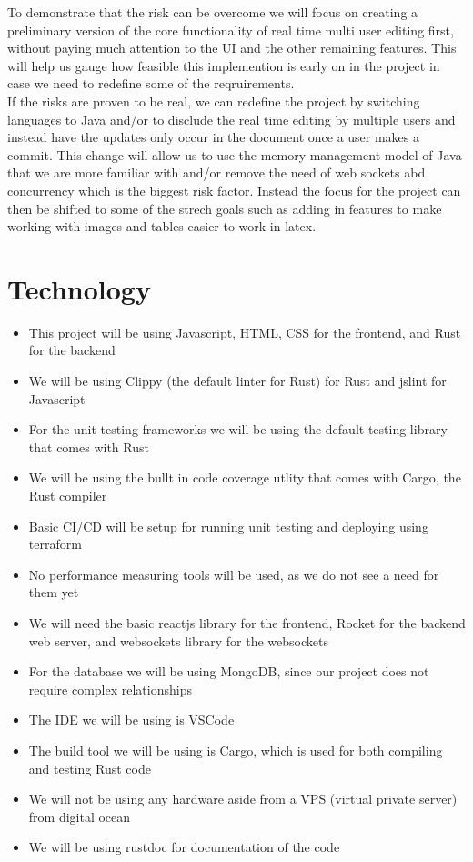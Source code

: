 \documentclass{article}
\begin{document}
To demonstrate that the risk can be overcome we will focus on creating a preliminary version of the core functionality of real time multi user editing first, without paying much attention to the UI and the other remaining features. This will
help us gauge how feasible this implemention is early on in the project in case we need to redefine some of the reqruirements.\\

If the risks are proven to be real, we can redefine the project by switching languages to Java and/or to disclude the real time editing by multiple users and instead have the updates only occur in the document once a user makes a commit. 
This change will allow us to use the memory management model of Java that we are more familiar with and/or remove the need of web sockets abd concurrency which is the biggest risk factor. Instead the focus for the project can then be 
shifted to some of the strech goals such as adding in features to make working with images and tables easier to work in latex.

\section{Technology}

\begin{itemize}
\item This project will be using Javascript, HTML, CSS for the frontend, and Rust for the backend
\item We will be using Clippy (the default linter for Rust) for Rust and jslint for Javascript
\item For the unit testing frameworks we will be using the default testing library that comes with Rust
\item We will be using the bullt in code coverage utlity that comes with Cargo, the Rust compiler
\item Basic CI/CD will be setup for running unit testing and deploying using terraform
\item No performance measuring tools will be used, as we do not see a need for them yet
\item We will need the basic reactjs library for the frontend, Rocket for the backend web server, and websockets library for the websockets
\item For the database we will be using MongoDB, since our project does not require complex relationships
\item The IDE we will be using is VSCode
\item The build tool we will be using is Cargo, which is used for both compiling and testing Rust code
\item We will not be using any hardware aside from a VPS (virtual private server) from digital ocean
\item We will be using rustdoc for documentation of the code
\end{itemize}
\end{document}
